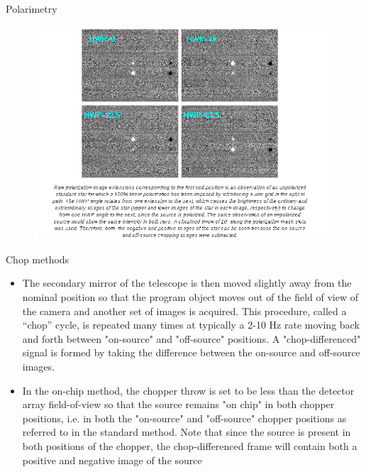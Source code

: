 \documentclass{beamer}
\begin{document}
\begin{frame}{Polarimetry}
\begin{figure}[H]
 \centering
 \includegraphics[scale=0.35]{img6.png}
\end{figure}
\end{frame}


\begin{frame}{Chop methods}
\begin{itemize}
\item The secondary mirror of the telescope is then moved slightly
away from the nominal position so that the program object moves out of the field of view
of the camera and another set of images is acquired. This procedure, called a “chop”
cycle, is repeated many times at typically a 2-10 Hz rate moving back and forth between 
"on-source" and "off-source" positions. A "chop-differenced" signal is formed by taking
the difference between the on-source and off-source images.

\item In the on-chip method, the
chopper throw is set to be less than the detector array field-of-view so that the source
remains "on chip" in both chopper positions, i.e. in both the "on-source" and "off-source"
chopper positions as referred to in the standard method. Note that since the source is present in both positions of the
chopper, the chop-differenced frame will contain both a positive and negative image of
the source 

\end{itemize}
\end{frame}
\end{document}
